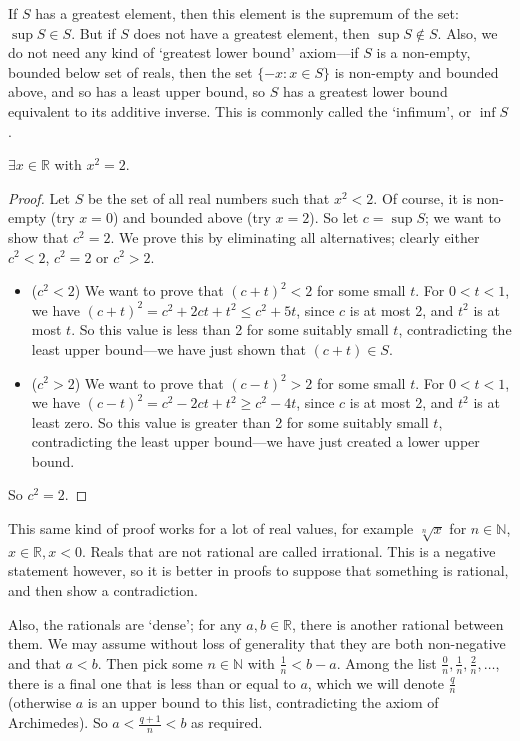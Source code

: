 \begin{remark}
	If \(S\) has a greatest element, then this element is the supremum of the set: \(\sup S \in S\).
	But if \(S\) does not have a greatest element, then \(\sup S \notin S\).
	Also, we do not need any kind of `greatest lower bound' axiom---if \(S\) is a non-empty, bounded below set of reals, then the set \(\{ -x: x \in S \}\) is non-empty and bounded above, and so has a least upper bound, so \(S\) has a greatest lower bound equivalent to its additive inverse.
	This is commonly called the `infimum', or \(\inf S\).
\end{remark}
\begin{theorem}
	\(\exists x \in \mathbb R\) with \(x^2 = 2\).
\end{theorem}
\begin{proof}
	Let \(S\) be the set of all real numbers such that \(x^2 < 2\).
	Of course, it is non-empty (try \(x=0\)) and bounded above (try \(x=2\)).
	So let \(c = \sup S\); we want to show that \(c^2 = 2\).
	We prove this by eliminating all alternatives; clearly either \(c^2 < 2\), \(c^2 = 2\) or \(c^2 > 2\).
	\begin{itemize}
		\item (\(c^2 < 2\)) We want to prove that \((c+t)^2 < 2\) for some small \(t\).
		      For \(0<t<1\), we have \((c+t)^2 = c^2 + 2ct + t^2 \leq c^2 + 5t\), since \(c\) is at most 2, and \(t^2\) is at most \(t\).
		      So this value is less than 2 for some suitably small \(t\), contradicting the least upper bound---we have just shown that \((c+t) \in S\).
		\item (\(c^2 > 2\)) We want to prove that \((c-t)^2 > 2\) for some small \(t\).
		      For \(0<t<1\), we have \((c-t)^2 = c^2 - 2ct + t^2 \geq c^2 - 4t\), since \(c\) is at most 2, and \(t^2\) is at least zero.
		      So this value is greater than 2 for some suitably small \(t\), contradicting the least upper bound---we have just created a lower upper bound.
	\end{itemize}
	So \(c^2 = 2\).
\end{proof}
This same kind of proof works for a lot of real values, for example \(\sqrt[n]{x}\) for \(n \in \mathbb N\), \(x\in \mathbb R, x < 0\).
Reals that are not rational are called irrational.
This is a negative statement however, so it is better in proofs to suppose that something is rational, and then show a contradiction.

Also, the rationals are `dense'; for any \(a, b \in \mathbb R\), there is another rational between them.
We may assume without loss of generality that they are both non-negative and that \(a<b\).
Then pick some \(n \in \mathbb N\) with \(\frac{1}{n} < b-a\).
Among the list \(\frac{0}{n}, \frac{1}{n}, \frac{2}{n}, \dots\), there is a final one that is less than or equal to \(a\), which we will denote \(\frac{q}{n}\) (otherwise \(a\) is an upper bound to this list, contradicting the axiom of Archimedes).
So \(a < \frac{q + 1}{n} < b\) as required.

